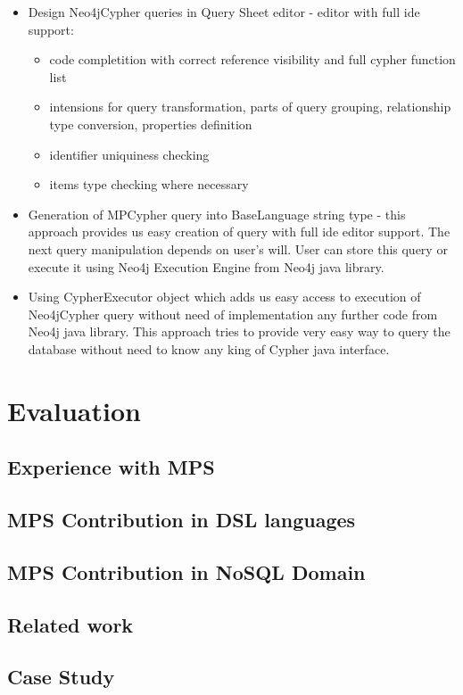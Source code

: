 \begin{itemize}
  \item Design Neo4jCypher queries in Query Sheet editor - editor with full ide support:
  	\begin{itemize}
  	  \item code completition with correct reference visibility and full cypher function list
  	  \item intensions for query transformation, parts of query grouping, relationship
  	  type conversion, properties definition
  	  \item identifier uniquiness checking
  	  \item items type checking where necessary
  	\end{itemize} 
  \item Generation of MPCypher query into BaseLanguage string type - this approach provides us
  easy creation of query with full ide editor support. The next query manipulation depends on user's
  will. User can store this query or execute it using Neo4j Execution Engine from Neo4j java
  library.
  \item Using CypherExecutor object which adds us easy access to execution of Neo4jCypher query
  without need of implementation any further code from Neo4j java library. This approach tries to
  provide very easy way to query the database without need to know any king of Cypher java
  interface.
\end{itemize}



\chapter{Evaluation}

\section{Experience with MPS}

\section{MPS Contribution in DSL languages}


\section{MPS Contribution in NoSQL Domain}

\section{Related work}
		
\section{Case Study}








